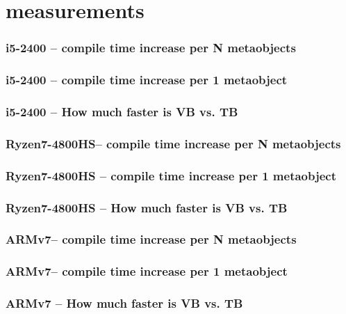 \documentclass[compress,table,xcolor=table]{beamer}
\begin{document}
\section{measurements}
\begin{frame}
  \frametitle{i5-2400 -- compile time increase per N metaobjects}
\end{frame}
\begin{frame}
  \frametitle{i5-2400 -- compile time increase per 1 metaobject}
\end{frame}
\begin{frame}
  \frametitle{i5-2400 -- How much faster is VB vs. TB}
\end{frame}
\begin{frame}
  \frametitle{Ryzen7-4800HS-- compile time increase per N metaobjects}
\end{frame}
\begin{frame}
  \frametitle{Ryzen7-4800HS -- compile time increase per 1 metaobject}
\end{frame}
\begin{frame}
  \frametitle{Ryzen7-4800HS -- How much faster is VB vs. TB}
\end{frame}
\begin{frame}
  \frametitle{ARMv7-- compile time increase per N metaobjects}
\end{frame}
\begin{frame}
  \frametitle{ARMv7-- compile time increase per 1 metaobject}
\end{frame}
\begin{frame}
  \frametitle{ARMv7 -- How much faster is VB vs. TB}
\end{frame}
\end{document}
